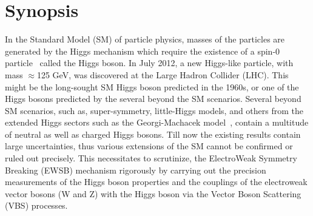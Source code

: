 \chapter*{Synopsis}
In the Standard Model (SM) of particle physics, masses of the particles are generated by the Higgs mechanism which require the existence of a spin-0 particle~\cite{Higgs1964,Higgs1964a,Higgs1966,Englert1964,Kibble1967,Guralnik1964} called the Higgs boson. In July 2012, a new Higgs-like particle, with mass $\approx$125 GeV, was discovered at the Large Hadron Collider (LHC). This might be the long-sought SM Higgs boson predicted in the 1960s, or one of the Higgs bosons predicted by the several beyond the SM scenarios. Several beyond SM scenarios, such as, super-symmetry, little-Higgs models, and others from the extended Higgs sectors such as the Georgi-Machacek model~\cite{GEORGI1985463}, contain a multitude of neutral as well as charged Higgs bosons. Till now the existing results contain large uncertainties, thus various extensions of the SM cannot be confirmed or ruled out precisely.
This necessitates to scrutinize, the ElectroWeak Symmetry Breaking (EWSB) mechanism rigorously by carrying out the precision measurements of the Higgs boson properties and the couplings of the electroweak vector bosons (W and Z) with the Higgs boson via the Vector Boson Scattering (VBS) processes.

